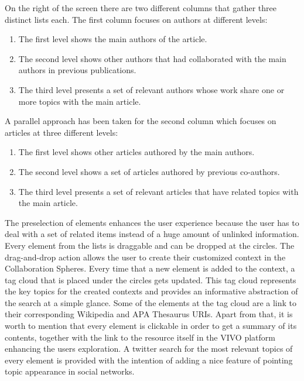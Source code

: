 On the right of the screen there are two different columns that gather three distinct lists each. The first column focuses on authors at different levels: 
\begin{enumerate}
  \item The first level shows the main authors of the article.
  \item The second level shows other authors that had collaborated with the main authors in previous publications.
  \item The third level presents a set of relevant authors whose work share one or more topics with the main article.
\end{enumerate}
A parallel approach has been taken for the second column which focuses on articles at three different levels:
\begin{enumerate}
  \item The first level shows other articles authored by the main authors.
  \item The second level shows  a set of articles authored by previous co-authors.
  \item The third level presents a set of relevant articles that have related topics with the main article.
\end{enumerate}  
The preselection of elements enhances the user experience because the user has to deal with a set of related items instead of a huge amount of unlinked information. Every element from the lists is draggable and can be dropped at the circles. The drag-and-drop action allows the user to create their customized context in the Collaboration Spheres.
Every time that a new element is added to the context, a tag cloud that is placed under the circles gets updated. This tag cloud represents the key topics for the created contexts and provides an informative abstraction of the search at a simple glance. Some of the elements at the tag cloud are a link to their corresponding Wikipedia and APA Thesaurus URIs.
Apart from that, it is worth to mention that every element is clickable in order to get a summary of its contents, together with the link to the resource itself in the VIVO platform enhancing the users exploration. A twitter search for the most relevant topics of every element is provided with the intention of adding a nice feature of pointing topic appearance in social networks.\\
